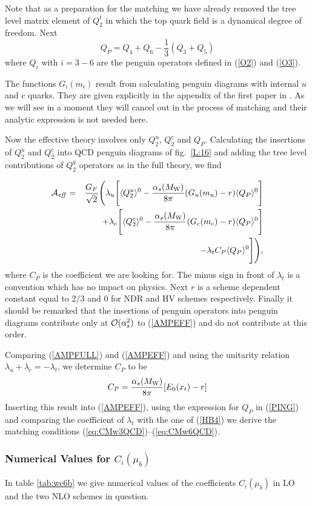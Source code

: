 \documentclass[12pt]{article}
\def\as{\alpha_s}
\newcommand{\mw}{M_{\rm W}}
\newcommand{\be}{\begin{equation}}
\newcommand{\ee}{\end{equation}}
\newcommand{\ord}{{\cal O}}
\begin{document}
\begin{itemize}
\begin{itemize}
Note that as a preparation for the matching we have already
removed the tree level matrix element of $Q_2^t$ in which
the top quark field is a dynamical degree of freedom.
Next
\be\label{PING}
Q_P=Q_4+Q_6-\frac{1}{3} (Q_3+Q_5)
\ee
where $Q_i$ with $i=3-6$ are the penguin operators defined
in (\ref{O2}) and (\ref{O3}).

The functions $G_i(m_i)$ result from calculating penguin diagrams
with internal $u$ and $c$ quarks. They are given explicitly in
the appendix of the first paper in \cite{BJLW1}. 
As we will see in a moment they will
cancel out in the process of matching and their analytic expression
is not needed here.

Now the effective theory involves only $Q_2^u$, $Q_2^c$ and $Q_P$.
Calculating the insertions of $Q_2^u$ and $Q_2^c$ into QCD penguin
diagrams of fig.~\ref{L:16} and adding the tree level contributions 
of $Q_2^q$ operators
as in the full theory, we find
 
\begin{eqnarray}\label{AMPEFF} 
{\cal A}_{\it eff} &=& 
\frac{G_F}{\sqrt{2}} 
\Bigg(\lambda_u \Bigg[\langle Q^u_2 \rangle^0  
 -\frac{\as(\mw)}{8\pi} (G_u(m_u)-r) \langle Q_P\rangle
^0\Bigg]
\nonumber\\ 
&& ~~~~~+\lambda_c \Bigg[\langle Q^c_2 \rangle^0  
 -\frac{\as(\mw)}{8\pi} (G_c(m_c)-r) \langle Q_P\rangle ^0\Bigg] 
\nonumber \\
&& ~~~~-\lambda_t C_P \langle Q_P\rangle ^0 \Bigg]\Bigg),
\end{eqnarray} 
where $C_P$ is the coefficient we are looking for. The minus sign
in front of $\lambda_t$ is a convention which has no impact on
physics. Next $r$ is a scheme dependent constant
equal to $2/3$ and $0$ for NDR and HV schemes respectively.
Finally it should be remarked that the insertions of penguin
operators into penguin diagrams contribute only at $\ord(\as^2)$
to (\ref{AMPEFF}) and do not contribute at this order.

Comparing (\ref{AMPFULL}) and (\ref{AMPEFF}) and using the unitarity
relation $\lambda_u+\lambda_c=-\lambda_t$, we determine $C_P$ to
be
\be\label{COFFCP}
C_P=\frac{\as(\mw)}{8\pi}[E_0(x_t)-r]
\ee
Inserting this result into (\ref{AMPEFF}), using the expression
for $Q_P$ in (\ref{PING}) and comparing the coefficient of $\lambda_t$
with the one of (\ref{HB4}) we derive the matching conditions 
(\ref{eq:CMw3QCD})--(\ref{eq:CMw6QCD}).  
\subsubsection{Numerical Values for $C_i(\mu_b)$}
In table \ref{tab:wc6b} we give numerical values of the coefficients
$C_i(\mu_b)$ in LO and the two NLO schemes in question.


\end{itemize}
\end{itemize}
\end{document}
